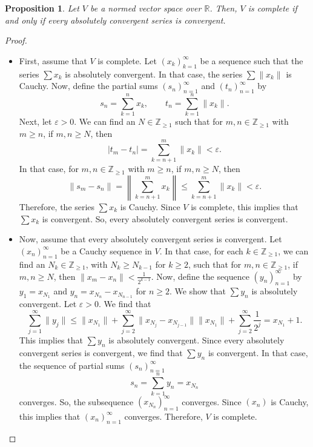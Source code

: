 \documentclass[a4paper, openany]{memoir}
\theoremstyle{definition}
\theoremstyle{plain}
\newtheorem{proposition}[definition]{Proposition}
\begin{document}
    \begin{proposition}
        Let $V$ be a normed vector space over $\mathbb{R}$. Then, $V$ is complete if and only if every absolutely convergent series is convergent.
    \end{proposition}
    \begin{proof}
        \hspace*{0pt}
        \begin{itemize}
            \item First, assume that $V$ is complete. Let $(x_k)_{k=1}^\infty$ be a sequence such that the series $\sum x_k$ is absolutely convergent. In that case, the series $\sum \lVert x_k \rVert$ is Cauchy. Now, define the partial sums $(s_n)_{n=1}^\infty$ and $(t_n)_{n=1}^\infty$ by
            \[s_n = \sum_{k=1}^n x_k, \qquad t_n = \sum_{k=1}^n \lVert x_k \rVert.\]
            Next, let $\varepsilon > 0$. We can find an $N \in \mathbb{Z}_{\geq 1}$ such that for $m, n \in \mathbb{Z}_{\geq 1}$ with $m \geq n$, if $m, n \geq N$, then 
            \[|t_m - t_n| = \sum_{k=n+1}^m \lVert x_k \rVert < \varepsilon.\]
            In that case, for $m, n \in \mathbb{Z}_{\geq 1}$ with $m \geq n$, if $m, n \geq N$, then
            \[\lVert s_m - s_n \rVert = \left\lVert \sum_{k=n+1}^m x_k \right\rVert \leq \sum_{k=n+1}^m \lVert x_k \rVert < \varepsilon.\]
            Therefore, the series $\sum x_k$ is Cauchy. Since $V$ is complete, this implies that $\sum x_k$ is convergent. So, every absolutely convergent series is convergent.
            
            \item Now, assume that every absolutely convergent series is convergent. Let $(x_n)_{n=1}^\infty$ be a Cauchy sequence in $V$. In that case, for each $k \in \mathbb{Z}_{\geq 1}$, we can find an $N_k \in \mathbb{Z}_{\geq 1}$, with $N_k \geq N_{k-1}$ for $k \geq 2$, such that for $m, n \in \mathbb{Z}_{\geq 1}$, if $m, n \geq N$, then $\lVert x_m - x_n \rVert < \frac{1}{2^{k-1}}$. Now, define the sequence $(y_n)_{n=1}^\infty$ by $y_1 = x_{N_1}$ and $y_n = x_{N_n} - x_{N_{n-1}}$ for $n \geq 2$. We show that $\sum y_n$ is absolutely convergent. Let $\varepsilon > 0$. We find that
            \[\sum_{j=1}^\infty \lVert y_j \rVert \leq \lVert x_{N_1} \rVert + \sum_{j=2}^\infty \lVert x_{N_j} - x_{N_{j-1}}\rVert \lVert x_{N_1} \rVert + \sum_{j=2}^\infty \frac{1}{2^j} = x_{N_1} + 1.\]
            This implies that $\sum y_n$ is absolutely convergent. Since every absolutely convergent series is convergent, we find that $\sum y_n$ is convergent. In that case, the sequence of partial sums $(s_n)_{n=1}^\infty$ 
            \[s_n = \sum_{k=1}^n y_n = x_{N_n}\]
            converges. So, the subsequence $(x_{N_n})_{n=1}^\infty$ converges. Since $(x_n)$ is Cauchy, this implies that $(x_n)_{n=1}^\infty$ converges. Therefore, $V$ is complete.
        \end{itemize}
    \end{proof}
\end{document}
